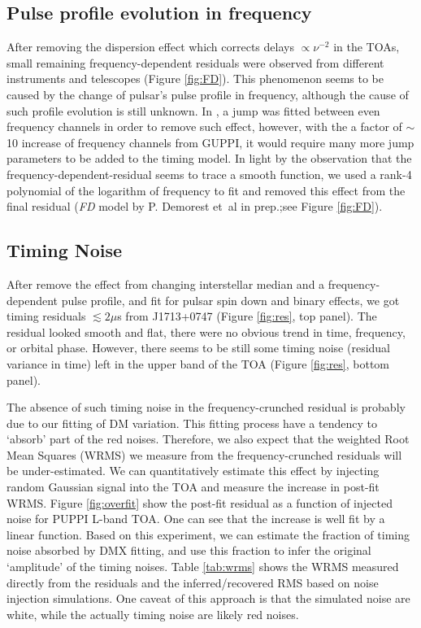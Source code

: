 \subsection{Pulse profile evolution in frequency}
\label{sec:FD}
After removing the dispersion effect which corrects delays $\propto \nu^{-2}$
in the TOAs, small remaining frequency-dependent residuals were observed from
different instruments and telescopes (Figure \ref{fig:FD}).  
This phenomenon seems to be caused by the change of pulsar's pulse profile in
frequency, although the cause of such profile evolution is still unknown.
In \citet{sns+05}, a jump was fitted between even frequency channels in order to remove such effect, however, with the a factor of $\sim$10 increase of frequency channels from GUPPI, it would require many more jump parameters to be added to the timing model.
In light by the observation that the frequency-dependent-residual seems to
trace a smooth function, we used a rank-4 polynomial of the logarithm of
frequency to fit and removed this effect from the final residual ({\it FD}
model by P. Demorest et~al in prep.;see Figure \ref{fig:FD}). 



\subsection{Timing Noise}
After remove the effect from changing interstellar median and a
frequency-dependent pulse profile, and fit for pulsar spin down and binary
effects, we got timing residuals $\lesssim 2\mu$s from J1713+0747 (Figure
\ref{fig:res}, top panel).
The residual looked smooth and flat, there were no obvious trend in time,
frequency, or orbital phase.
However, there seems to be still some timing noise (residual variance in time)
left in the upper band of the TOA (Figure \ref{fig:res}, bottom panel).

The absence of such timing noise in the frequency-crunched residual is probably due to
our fitting of DM variation. 
This fitting process have a tendency to `absorb' part of the red noises.
Therefore, we also expect that the weighted Root Mean Squares (WRMS) we measure from the
frequency-crunched residuals will be under-estimated. We can quantitatively
estimate this effect by injecting random Gaussian signal into the TOA and
measure the increase in post-fit WRMS. Figure \ref{fig:overfit} show
the post-fit residual as a function of injected noise for PUPPI L-band TOA. 
One can see that the increase is well fit by a linear function. 
Based on this experiment, we
can estimate the fraction of timing noise absorbed by DMX fitting, and use
this fraction to infer the original `amplitude' of the timing noises. 
Table \ref{tab:wrms} shows the WRMS measured directly from the
residuals and 
the inferred/recovered RMS based on noise injection simulations. One caveat of this
approach is that the simulated noise are white, while the actually timing
noise are likely red noises. 

